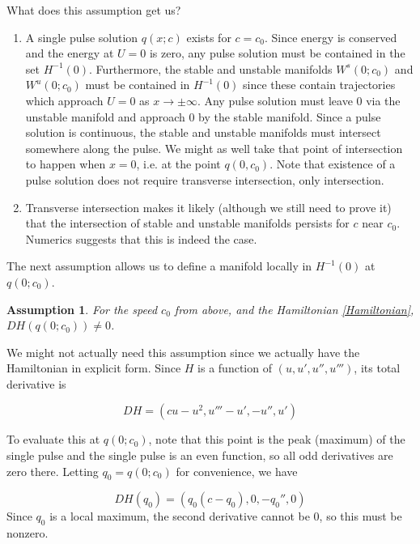 \documentclass[12pt]{article}
\newtheorem{assumption}{Assumption}
\begin{document}
What does this assumption get us?
\begin{enumerate}
	\item A single pulse solution $q(x; c)$ exists for $c = c_0$. Since energy is conserved and the energy at $U = 0$ is zero, any pulse solution must be contained in the set $H^{-1}(0)$. Furthermore, the stable and unstable manifolds $W^s(0; c_0)$ and $W^u(0; c_0)$ must be contained in $H^{-1}(0)$ since these contain trajectories which approach $U = 0$ as $x \rightarrow \pm \infty$. Any pulse solution must leave 0 via the unstable manifold and approach 0 by the stable manifold.	Since a pulse solution is continuous, the stable and unstable manifolds must intersect somewhere along the pulse. We might as well take that point of intersection to happen when $x = 0$, i.e. at the point $q(0, c_0)$. Note that existence of a pulse solution does not require transverse intersection, only intersection.
	\item Transverse intersection makes it likely (although we still need to prove it) that the intersection of stable and unstable manifolds persists for $c$ near $c_0$. Numerics suggests that this is indeed the case.
\end{enumerate}

The next assumption allows us to define a manifold locally in $H^{-1}(0)$ at $q(0; c_0)$. 

\begin{assumption}\label{DHnonzero}
For the speed $c_0$ from above, and the Hamiltonian \eqref{Hamiltonian}, $DH(q(0; c_0)) \neq 0$.
\end{assumption}

We might not actually need this assumption since we actually have the Hamiltonian in explicit form. Since $H$ is a function of $(u, u', u'', u''')$, its total derivative is

\[
DH = (cu - u^2, u''' - u', -u'', u')
\]

To evaluate this at $q(0; c_0)$, note that this point is the peak (maximum) of the single pulse and the single pulse is an even function, so all odd derivatives are zero there. Letting $q_0 = q(0; c_0)$ for convenience, we have

\[
DH(q_0) = (q_0(c -q_0), 0, -q_0'', 0)
\]
Since $q_0$ is a local maximum, the second derivative cannot be 0, so this must be nonzero.\\
\end{document}
